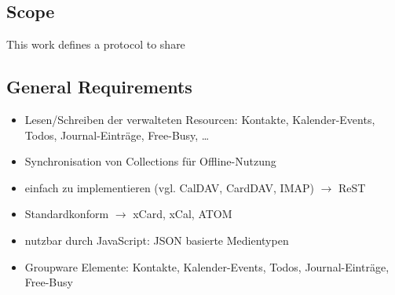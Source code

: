 \documentclass[12pt,a4paper]{scrartcl}		%
\begin{document}
\subsection{Scope}

This work defines a protocol to share 


\subsection{General Requirements}

\begin{itemize}
  \item Lesen/Schreiben der verwalteten Resourcen: Kontakte, Kalender-Events, Todos, Journal-Einträge, Free-Busy, \ldots
  \item Synchronisation von Collections für Offline-Nutzung
  \item einfach zu implementieren (vgl. CalDAV, CardDAV, IMAP) $\rightarrow$ ReST
  \item Standardkonform $\rightarrow$ xCard, xCal, ATOM
  \item nutzbar durch JavaScript: JSON basierte Medientypen
  \item Groupware Elemente: Kontakte, Kalender-Events, Todos, Journal-Einträge, Free-Busy
\end{itemize}
\end{document}
